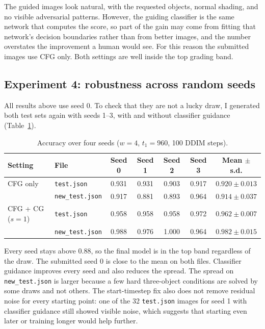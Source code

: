 \documentclass[11pt]{article}
\begin{document}
The guided images look natural, with the requested objects, normal shading, and no visible
adversarial patterns. However, the guiding classifier is the same network that computes the
score, so part of the gain may come from fitting that network's decision boundaries rather
than from better images, and the number overstates the improvement a human would see. For
this reason the submitted images use CFG only. Both settings are well inside the top
grading band.

\subsection{Experiment 4: robustness across random seeds}\label{sec:seeds}
All results above use seed 0. To check that they are not a lucky draw, I generated both
test sets again with seeds 1--3, with and without classifier guidance
(Table~\ref{tab:seeds}).

\begin{table}[H]
\centering\small
\begin{tabular}{llccccc}
\toprule
Setting & File & Seed 0 & Seed 1 & Seed 2 & Seed 3 & Mean $\pm$ s.d. \\
\midrule
CFG only & \texttt{test.json} & 0.931 & 0.931 & 0.903 & 0.917 & $0.920\pm0.013$ \\
 & \texttt{new\_test.json} & 0.917 & 0.881 & 0.893 & 0.964 & $0.914\pm0.037$ \\
\midrule
CFG + CG ($s=1$) & \texttt{test.json} & 0.958 & 0.958 & 0.958 & 0.972 & $0.962\pm0.007$ \\
 & \texttt{new\_test.json} & 0.988 & 0.976 & 1.000 & 0.964 & $0.982\pm0.015$ \\
\bottomrule
\end{tabular}
\caption{Accuracy over four seeds ($w=4$, $t_1=960$, 100 DDIM steps).}
\label{tab:seeds}
\end{table}

Every seed stays above 0.88, so the final model is in the top band regardless of the draw.
The submitted seed 0 is close to the mean on both files. Classifier guidance improves
every seed and also reduces the spread. The spread on \texttt{new\_test.json} is larger
because a few hard three-object conditions are solved by some draws and not others. The
start-timestep fix also does not remove residual noise for every starting point: one of
the 32 \texttt{test.json} images for seed 1 with classifier guidance still showed visible
noise, which suggests that starting even later
or training longer would help further.
\end{document}
